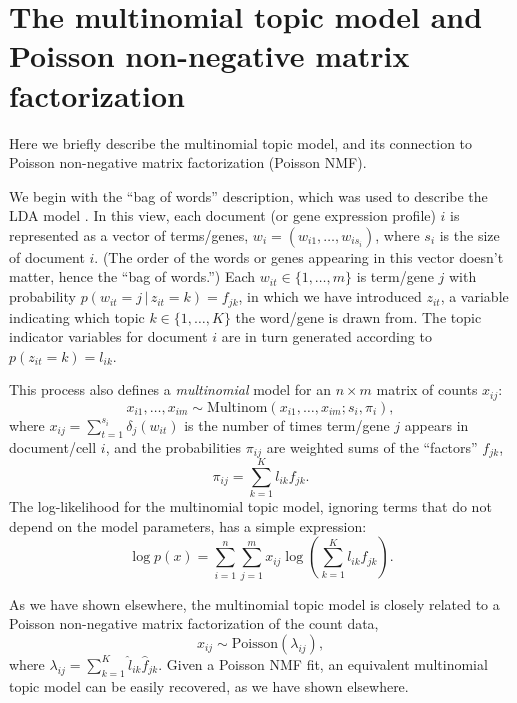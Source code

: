 \documentclass[final]{siamart171218}
\begin{document}
\section{The multinomial topic model and Poisson non-negative matrix
  factorization}

Here we briefly describe the multinomial topic model, and its
connection to Poisson non-negative matrix factorization (Poisson NMF).

We begin with the ``bag of words'' description, which was used to
describe the LDA model \cite{blei-2003}. In this view, each document
(or gene expression profile) $i$ is represented as a vector of
terms/genes, $w_i = (w_{i1}, \ldots, w_{is_i})$, where $s_i$ is the
size of document $i$. (The order of the words or genes appearing in
this vector doesn't matter, hence the ``bag of words.'') Each $w_{it}
\in \{1, \ldots, m\}$ is term/gene $j$ with probability
$p(w_{it} = j \,|\, z_{it} = k) = f_{jk}$, in which we have introduced
$z_{it}$, a variable indicating which topic $k \in \{1, \ldots, K\}$
the word/gene is drawn from. The topic indicator variables for
document $i$ are in turn generated according to $p(z_{it} = k) =
l_{ik}$.

This process also defines a {\em multinomial} model for an $n \times
m$ matrix of counts $x_{ij}$:
\begin{equation}
x_{i1}, \ldots, x_{im} \sim
\mathrm{Multinom}(x_{i1}, \ldots, x_{im}; s_i, \pi_i),
\end{equation}
where $x_{ij} = \sum_{t=1}^{s_i} \delta_j(w_{it})$ is the number of
times term/gene $j$ appears in document/cell $i$, and the
probabilities $\pi_{ij}$ are weighted sums of the ``factors''
$f_{jk}$,
\begin{equation}
\pi_{ij} = \sum_{k=1}^K l_{ik} f_{jk}.
\end{equation}
The log-likelihood for the multinomial topic model, ignoring terms
that do not depend on the model parameters, has a simple expression:
\begin{equation}
\log p(x) = \sum_{i=1}^n \sum_{j=1}^m
x_{ij} \log({\textstyle \sum_{k=1}^K l_{ik} f_{jk}}).
\end{equation}

As we have shown elsewhere, the multinomial topic model is closely
related to a Poisson non-negative matrix factorization of the count
data,
\begin{equation}
x_{ij} \sim \mathrm{Poisson}(\lambda_{ij}),
\end{equation}
where $\lambda_{ij} = \sum_{k=1}^K \hat{l}_{ik} \hat{f}_{jk}$. Given a
Poisson NMF fit, an equivalent multinomial topic model can be easily
recovered, as we have shown elsewhere.
\end{document}
